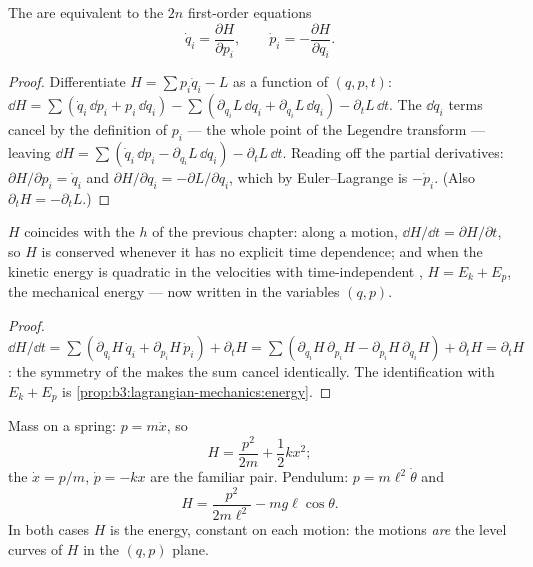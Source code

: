 \begin{theorem}\label{thm:b3:hamiltonian-mechanics:canonical}
The  are equivalent to the $2n$ first-order
equations
\[
\dot q_i = \frac{\partial H}{\partial p_i} , \qquad
\dot p_i = -\frac{\partial H}{\partial q_i} .
\]
\end{theorem}

\begin{proof}
Differentiate $H = \sum p_i\dot q_i - L$ as a function of $(q, p, t)$:
$\dd H = \sum(\dot q_i\,\dd p_i + p_i\,\dd\dot q_i) - \sum(
\partial_{q_i}L\,\dd q_i + \partial_{\dot q_i}L\,\dd\dot q_i) -
\partial_tL\,\dd t$. The $\dd\dot q_i$ terms cancel by the definition
of $p_i$ --- the whole point of the Legendre transform --- leaving
$\dd H = \sum(\dot q_i\,\dd p_i - \partial_{q_i}L\,\dd q_i) -
\partial_tL\,\dd t$. Reading off the partial derivatives:
$\partial H/\partial p_i = \dot q_i$ and $\partial H/\partial q_i =
-\partial L/\partial q_i$, which by Euler--Lagrange is $-\dot p_i$.
(Also $\partial_tH = -\partial_tL$.)
\end{proof}

\begin{proposition}[What $H$ is]\label{prop:b3:hamiltonian-mechanics:energy}
$H$ coincides with the  $h$ of the previous chapter:
along a motion, $\dd H/\dd t = \partial H/\partial t$, so $H$ is
conserved whenever it has no explicit time dependence; and when the
kinetic energy is quadratic in the velocities with time-independent
, $H = E_k + E_p$, the mechanical energy --- now written in
the variables $(q, p)$.
\end{proposition}

\begin{proof}
$\dd H/\dd t = \sum(\partial_{q_i}H\,\dot q_i + \partial_{p_i}H\,\dot
p_i) + \partial_tH = \sum(\partial_{q_i}H\,\partial_{p_i}H -
\partial_{p_i}H\,\partial_{q_i}H) + \partial_tH = \partial_tH$: the
symmetry of the  makes the sum cancel identically.
The identification with $E_k + E_p$ is
\cref{prop:b3:lagrangian-mechanics:energy}.
\end{proof}

\begin{example}\label{ex:b3:hamiltonian-mechanics:examples}
Mass on a spring: $p = m\dot x$, so
\[
H = \frac{p^2}{2m} + \frac12 kx^2 ;
\]
the  $\dot x = p/m$, $\dot p = -kx$ are the familiar
pair. Pendulum: $p = m\ell^2\dot\theta$ and
\[
H = \frac{p^2}{2m\ell^2} - mg\ell\cos\theta .
\]
In both cases $H$ is the energy, constant on each motion: the motions
\emph{are} the level curves of $H$ in the $(q,p)$ plane.
\end{example}

